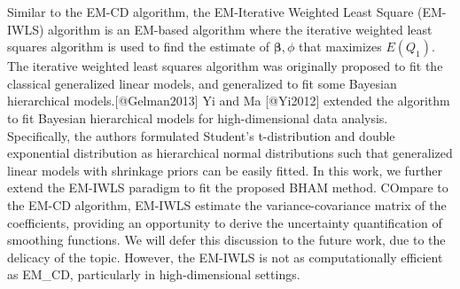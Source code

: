 \documentclass[
]{article}
\begin{document}
Similar to the EM-CD algorithm, the EM-Iterative Weighted Least Square
(EM-IWLS) algorithm is an EM-based algorithm where the iterative
weighted least squares algorithm is used to find the estimate of
\(\boldsymbol{\beta}, \phi\) that maximizes \(E(Q_1)\). The iterative
weighted least squares algorithm was originally proposed to fit the
classical generalized linear models, and generalized to fit some
Bayesian hierarchical models.{[}@Gelman2013{]} Yi and Ma {[}@Yi2012{]}
extended the algorithm to fit Bayesian hierarchical models for
high-dimensional data analysis. Specifically, the authors formulated
Student's t-distribution and double exponential distribution as
hierarchical normal distributions such that generalized linear models
with shrinkage priors can be easily fitted. In this work, we further
extend the EM-IWLS paradigm to fit the proposed BHAM method. COmpare to
the EM-CD algorithm, EM-IWLS estimate the variance-covariance matrix of
the coefficients, providing an opportunity to derive the uncertainty
quantification of smoothing functions. We will defer this discussion to
the future work, due to the delicacy of the topic. However, the EM-IWLS
is not as computationally efficient as EM\_CD, particularly in
high-dimensional settings.
\end{document}
